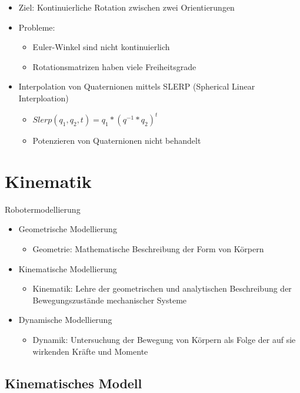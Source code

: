 \documentclass[paper=a4, fontsize=11pt]{scrartcl} %
\numberwithin{equation}{section} %
\numberwithin{figure}{section} %
\numberwithin{table}{section} %
\begin{document}
\begin{itemize}
\begin{itemize}
\item Ziel: Kontinuierliche Rotation zwischen zwei Orientierungen
\item Probleme:
\begin{itemize}
\item Euler-Winkel sind nicht kontinuierlich
\item Rotationsmatrizen haben viele Freiheitsgrade
\end{itemize}
\item Interpolation von Quaternionen mittels SLERP (Spherical Linear Interploation)
\begin{itemize}
\item $Slerp(q_1,q_2,t) = q_1 * (q^{-1} * q_2)^t$
\item Potenzieren von Quaternionen nicht behandelt
\end{itemize}
\end{itemize}
\end{itemize}

\section{Kinematik}

Robotermodellierung
\begin{itemize}
\item Geometrische Modellierung
\begin{itemize}
\item Geometrie: Mathematische Beschreibung der Form von Körpern
\end{itemize}
\item Kinematische Modellierung
\begin{itemize}
\item Kinematik: Lehre der geometrischen und analytischen Beschreibung der Bewegungszustände mechanischer Systeme
\end{itemize}
\item Dynamische Modellierung
\begin{itemize}
\item Dynamik: Untersuchung der Bewegung von Körpern als Folge der auf sie wirkenden Kräfte und Momente
\end{itemize}
\end{itemize}

\subsection{Kinematisches Modell}
\end{document}
